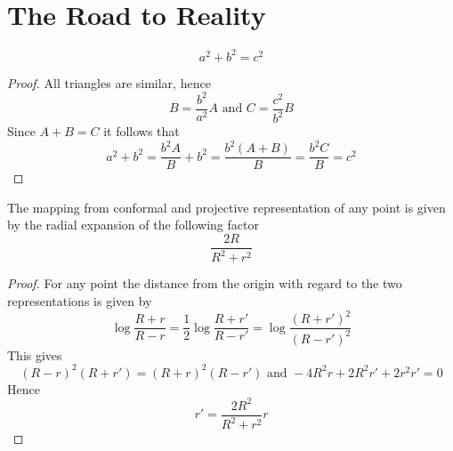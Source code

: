 
\newpage
\section{The Road to Reality}
\begin{theorem}[Pythagoras]\label{thm:thm_pythagoras}

\[
    a^2 + b^2 = c^2
\]
\end{theorem}


\begin{proof}
All triangles are similar, hence
\[
    B = \frac{b^2}{a^2} A \text{ and }  C =  \frac{c^2}{b^2} B 
\]
Since \( A + B = C \) it follows that
\[
     a^2 + b^2 = \frac{b^2A}{B} + b^2 = \frac{b^2(A + B)}{B} = \frac{b^2 C}{B} = c^2
\]
\end{proof}
\bigskip




The mapping from conformal and projective representation of any point is given by the radial expansion 
of the following factor
\[
   \frac{2R}{R^2 + r^2}
\]  

\begin{proof}
For any point the distance from the origin with regard to the two representations is given by
\[
    \log \frac{R + r}{R - r} = \frac{1}{2} \log \frac{R + r'}{R - r'} = \log \frac{(R + r')^2}{(R - r')^2}
\]
This gives
\[
  {(R - r)}^2 (R + r') = {(R + r)}^2 (R - r') \text{ and } -4R^2r + 2R^2r' + 2r^2r' = 0
\] 
Hence
\[
   r' = \frac{2R^2}{R^2 + r^2} r
\] 
\end{proof}
